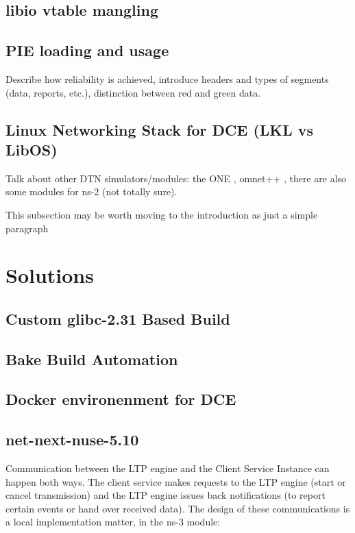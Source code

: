 \documentclass{sig-alternate}
\begin{document}
\subsection{libio vtable mangling}

\subsection{PIE loading and usage}
Describe how reliability is achieved, introduce headers and types of segments (data, reports, etc.), distinction between red and green data.

\subsection{Linux Networking Stack for DCE (LKL vs LibOS) }
Talk about other DTN simulators/modules: the ONE \cite{one} , omnet++ \cite{omnet}, there are also some modules for ns-2 (not totally sure).

This subsection may be worth moving to the introduction as just a simple paragraph

\section{Solutions}
\label{section:design}

\subsection{Custom glibc-2.31 Based Build}

\subsection{Bake Build Automation}

\subsection{Docker environenment for DCE}

\subsection{net-next-nuse-5.10}

Communication between the LTP engine and the Client Service Instance can happen both ways. 
The client service makes requests to the LTP engine (start or cancel transmission) and 
the LTP engine issues back notifications (to report certain events or hand over received data). 
The design of these communications is a local implementation matter, in the ns-3 module:
\end{document}
